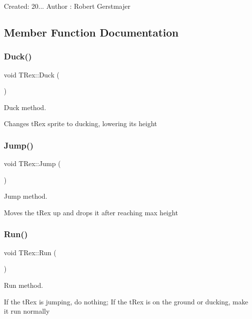 Created\+: 20... Author \+: Robert Gerstmajer 

\subsection{Member Function Documentation}
\mbox{\label{class_t_rex_a1e672bcdbbeab5bc66c1812e3be30fd3}} 
\subsubsection{\texorpdfstring{Duck()}{Duck()}}
{\footnotesize\ttfamily void T\+Rex\+::\+Duck (\begin{DoxyParamCaption}{ }\end{DoxyParamCaption})}



Duck method. 

Changes t\+Rex sprite to ducking, lowering its height \mbox{\label{class_t_rex_abc238b8e1df77d79f259cadd3a6c4cc8}} 
\subsubsection{\texorpdfstring{Jump()}{Jump()}}
{\footnotesize\ttfamily void T\+Rex\+::\+Jump (\begin{DoxyParamCaption}{ }\end{DoxyParamCaption})}



Jump method. 

Moves the t\+Rex up and drops it after reaching max height \mbox{\label{class_t_rex_af0e9ccbecc23739201a85e489da81efd}} 
\subsubsection{\texorpdfstring{Run()}{Run()}}
{\footnotesize\ttfamily void T\+Rex\+::\+Run (\begin{DoxyParamCaption}{ }\end{DoxyParamCaption})}



Run method. 

If the t\+Rex is jumping, do nothing; If the t\+Rex is on the ground or ducking, make it run normally \mbox{\label{class_t_rex_aaef538213b79fb870e8af8f0cdf39a14}} 
